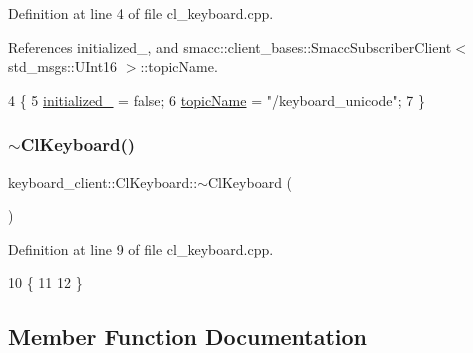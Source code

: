 Definition at line 4 of file cl\+\_\+keyboard.\+cpp.



References initialized\+\_\+, and smacc\+::client\+\_\+bases\+::\+Smacc\+Subscriber\+Client$<$ std\+\_\+msgs\+::\+U\+Int16 $>$\+::topic\+Name.


\begin{DoxyCode}
4                        \{
5   \hyperlink{classkeyboard__client_1_1ClKeyboard_aff74d4f212f4846a1f7cc6c0e4d5f728}{initialized\_} = \textcolor{keyword}{false};
6   \hyperlink{classsmacc_1_1client__bases_1_1SmaccSubscriberClient_aeadf21a09412c6c9488e5acd50fb4f40}{topicName} = \textcolor{stringliteral}{"/keyboard\_unicode"};
7 \}
\end{DoxyCode}
\mbox{\label{classkeyboard__client_1_1ClKeyboard_a0e9bfb4a0e564e26f57248a78a78d087}} 
\subsubsection{\texorpdfstring{$\sim$\+Cl\+Keyboard()}{~ClKeyboard()}}
{\footnotesize\ttfamily keyboard\+\_\+client\+::\+Cl\+Keyboard\+::$\sim$\+Cl\+Keyboard (\begin{DoxyParamCaption}{ }\end{DoxyParamCaption})\hspace{0.3cm}{\ttfamily [virtual]}}



Definition at line 9 of file cl\+\_\+keyboard.\+cpp.


\begin{DoxyCode}
10 \{
11   
12 \}
\end{DoxyCode}


\subsection{Member Function Documentation}
\mbox{\label{classkeyboard__client_1_1ClKeyboard_a9643ea9235ee12d054c87f79fbf31211}} 
